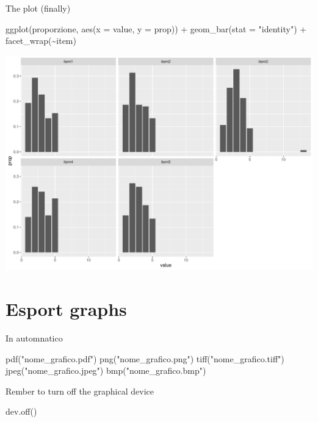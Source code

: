 \documentclass[
  ignorenonframetext,
]{beamer}
\newenvironment{Shaded}{\begin{snugshade}}{\end{snugshade}}
\newcommand{\AttributeTok}[1]{\textcolor[rgb]{0.00,0.34,0.68}{#1}}
\newcommand{\FunctionTok}[1]{\textcolor[rgb]{0.39,0.29,0.61}{#1}}
\newcommand{\NormalTok}[1]{\textcolor[rgb]{0.12,0.11,0.11}{#1}}
\newcommand{\SpecialCharTok}[1]{\textcolor[rgb]{0.24,0.68,0.91}{#1}}
\newcommand{\StringTok}[1]{\textcolor[rgb]{0.75,0.01,0.01}{#1}}
\begin{document}
\begin{frame}[fragile]{The plot (finally)}
\protect\hypertarget{the-plot-finally}{}
\begin{Shaded}
\begin{Highlighting}[]
\FunctionTok{ggplot}\NormalTok{(proporzione, }
       \FunctionTok{aes}\NormalTok{(}\AttributeTok{x =}\NormalTok{ value, }\AttributeTok{y =}\NormalTok{ prop)) }\SpecialCharTok{+} 
  \FunctionTok{geom\_bar}\NormalTok{(}\AttributeTok{stat =} \StringTok{"identity"}\NormalTok{) }\SpecialCharTok{+} 
  \FunctionTok{facet\_wrap}\NormalTok{(}\SpecialCharTok{\textasciitilde{}}\NormalTok{item) }
\end{Highlighting}
\end{Shaded}

\begin{center}\includegraphics[width=0.7\linewidth]{Practice_files/figure-beamer/unnamed-chunk-84-1} \end{center}
\end{frame}

\hypertarget{esport-graphs}{%
\section{Esport graphs}\label{esport-graphs}}

\begin{frame}[fragile]{In automnatico}
\protect\hypertarget{in-automnatico}{}
\begin{Shaded}
\begin{Highlighting}[]
\FunctionTok{pdf}\NormalTok{(}\StringTok{"nome\_grafico.pdf"}\NormalTok{)}
\FunctionTok{png}\NormalTok{(}\StringTok{"nome\_grafico.png"}\NormalTok{)          }
\FunctionTok{tiff}\NormalTok{(}\StringTok{"nome\_grafico.tiff"}\NormalTok{)}
\FunctionTok{jpeg}\NormalTok{(}\StringTok{"nome\_grafico.jpeg"}\NormalTok{)}
\FunctionTok{bmp}\NormalTok{(}\StringTok{"nome\_grafico.bmp"}\NormalTok{)}
\end{Highlighting}
\end{Shaded}

Rember to turn off the graphical device

\begin{Shaded}
\begin{Highlighting}[]
\FunctionTok{dev.off}\NormalTok{()}
\end{Highlighting}
\end{Shaded}
\end{frame}
\end{document}
